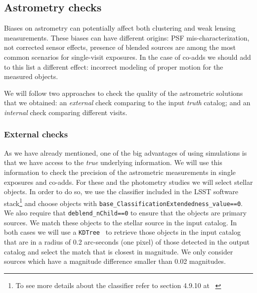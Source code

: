 \documentclass[\docopts]{\docclass}
\begin{document}
\subsection{Astrometry checks}
\label{sec:astrometry_checks}

Biases on astrometry can potentially affect both clustering and weak lensing measurements. These biases
can have different origins: PSF mis-characterization, not corrected sensor effects, presence of blended sources are among
the most common scenarios for single-visit exposures. In the case of co-adds we should add to this list a different effect:
incorrect modeling of proper motion for the measured objects.

We will follow two approaches to check the quality of the astrometric solutions that we obtained: an \textit{external} check
comparing to the input \textit{truth} catalog; and an \textit{internal} check comparing different visits.

\subsubsection{External checks}
\label{sec:external_astrometry}

As we have already mentioned, one of the big advantages of using simulations is that we have access to the \textit{true}
underlying information. We will use this information to check the precision of the astrometric measurements in single exposures
and co-adds. For these and the photometry studies we will select stellar objects. In order to do so, we use the classifier
included in the LSST software stack\footnote{To see more details about the classifier refer to section 4.9.10 at
~\citep{2017arXiv170506766B}} and choose objects with \texttt{base\_ClassificationExtendedness\_value==0}.
We also require that \texttt{deblend\_nChild==0} to ensure that the objects are primary sources. We match these objects to the
stellar source in the input catalog. In both cases we will use a \texttt{KDTree}~\citep{scikit-learn} to retrieve those objects
in the input catalog that are in a radius of 0.2 arc-seconds (one pixel) of those detected in the output catalog and select the
match that is closest in magnitude. We only consider sources which have a magnitude difference smaller than 0.02 magnitudes.
\end{document}
